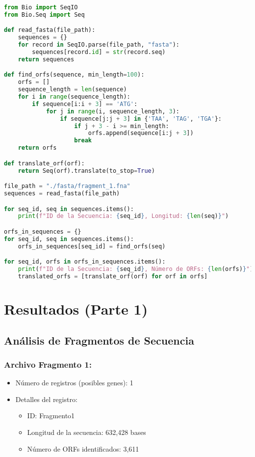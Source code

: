 \begin{lstlisting}[language=Python]
from Bio import SeqIO
from Bio.Seq import Seq

def read_fasta(file_path):
    sequences = {}
    for record in SeqIO.parse(file_path, "fasta"):
        sequences[record.id] = str(record.seq)
    return sequences

def find_orfs(sequence, min_length=100):
    orfs = []
    sequence_length = len(sequence)
    for i in range(sequence_length):
        if sequence[i:i + 3] == 'ATG':
            for j in range(i, sequence_length, 3):
                if sequence[j:j + 3] in {'TAA', 'TAG', 'TGA'}:
                    if j + 3 - i >= min_length:
                        orfs.append(sequence[i:j + 3])
                    break
    return orfs

def translate_orf(orf):
    return Seq(orf).translate(to_stop=True)

file_path = "./fasta/fragment_1.fna"
sequences = read_fasta(file_path)

for seq_id, seq in sequences.items():
    print(f"ID de la Secuencia: {seq_id}, Longitud: {len(seq)}")

orfs_in_sequences = {}
for seq_id, seq in sequences.items():
    orfs_in_sequences[seq_id] = find_orfs(seq)

for seq_id, orfs in orfs_in_sequences.items():
    print(f"ID de la Secuencia: {seq_id}, Número de ORFs: {len(orfs)}")
    translated_orfs = [translate_orf(orf) for orf in orfs]
\end{lstlisting}

\section*{Resultados (Parte 1)}

\subsection*{Análisis de Fragmentos de Secuencia}

\subsubsection*{Archivo Fragmento 1:}
\begin{itemize}
\item Número de registros (posibles genes): 1
\item Detalles del registro:
  \begin{itemize}
  \item ID: Fragmento1
  \item Longitud de la secuencia: 632,428 bases
  \item Número de ORFs identificados: 3,611
  \end{itemize}
\end{itemize}

